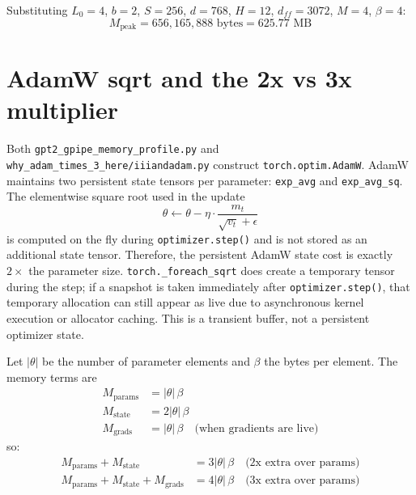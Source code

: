\documentclass[11pt,a4paper]{article}
\begin{document}
\noindent Substituting $L_0=4$, $b=2$, $S=256$, $d=768$, $H=12$, $d_{ff}=3072$, $M=4$, $\beta=4$:
\begin{equation}
  M_{\text{peak}} = 656{,}165{,}888 \text{~bytes} = 625.77 \text{~MB}
\end{equation}

\section{AdamW sqrt and the 2x vs 3x multiplier}
\label{sec:adam_sqrt}

Both \texttt{gpt2\_gpipe\_memory\_profile.py} and \texttt{why\_adam\_times\_3\_here/iiiandadam.py} construct
\texttt{torch.optim.AdamW}. AdamW maintains two persistent state tensors per parameter: \texttt{exp\_avg}
and \texttt{exp\_avg\_sq}. The elementwise square root used in the update
\begin{equation}
  \theta \leftarrow \theta - \eta \cdot \frac{m_t}{\sqrt{v_t} + \epsilon}
\end{equation}
is computed on the fly during \texttt{optimizer.step()} and is not stored as an additional state tensor.
Therefore, the persistent AdamW state cost is exactly $2 \times$ the parameter size. \texttt{torch._foreach_sqrt}
does create a temporary tensor during the step; if a snapshot is taken immediately after
\texttt{optimizer.step()}, that temporary allocation can still appear as live due to asynchronous
kernel execution or allocator caching. This is a transient buffer, not a persistent optimizer state.

Let $|\theta|$ be the number of parameter elements and $\beta$ the bytes per element. The memory terms are
\begin{align}
  M_{\text{params}} &= |\theta| \, \beta \\
  M_{\text{state}}  &= 2 |\theta| \, \beta \\
  M_{\text{grads}}  &= |\theta| \, \beta \quad \text{(when gradients are live)}
\end{align}
so:
\begin{align}
  M_{\text{params}} + M_{\text{state}} &= 3 |\theta| \, \beta \quad \text{(2x extra over params)} \\
  M_{\text{params}} + M_{\text{state}} + M_{\text{grads}} &= 4 |\theta| \, \beta \quad \text{(3x extra over params)}
\end{align}
\end{document}
